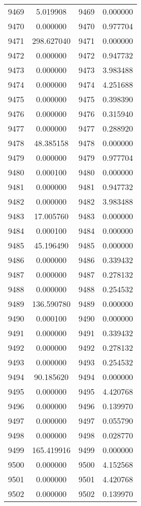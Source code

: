 \documentclass[12pt]{article}
\begin{document}
\begin{longtable}{@{}cccc@{}}
9469 & 5.019908 & 9469 & 0.000000 \\
9470 & 0.000000 & 9470 & 0.977704 \\
9471 & 298.627040 & 9471 & 0.000000 \\
9472 & 0.000000 & 9472 & 0.947732 \\
9473 & 0.000000 & 9473 & 3.983488 \\
9474 & 0.000000 & 9474 & 4.251688 \\
9475 & 0.000000 & 9475 & 0.398390 \\
9476 & 0.000000 & 9476 & 0.315940 \\
9477 & 0.000000 & 9477 & 0.288920 \\
9478 & 48.385158 & 9478 & 0.000000 \\
9479 & 0.000000 & 9479 & 0.977704 \\
9480 & 0.000100 & 9480 & 0.000000 \\
9481 & 0.000000 & 9481 & 0.947732 \\
9482 & 0.000000 & 9482 & 3.983488 \\
9483 & 17.005760 & 9483 & 0.000000 \\
9484 & 0.000100 & 9484 & 0.000000 \\
9485 & 45.196490 & 9485 & 0.000000 \\
9486 & 0.000000 & 9486 & 0.339432 \\
9487 & 0.000000 & 9487 & 0.278132 \\
9488 & 0.000000 & 9488 & 0.254532 \\
9489 & 136.590780 & 9489 & 0.000000 \\
9490 & 0.000100 & 9490 & 0.000000 \\
9491 & 0.000000 & 9491 & 0.339432 \\
9492 & 0.000000 & 9492 & 0.278132 \\
9493 & 0.000000 & 9493 & 0.254532 \\
9494 & 90.185620 & 9494 & 0.000000 \\
9495 & 0.000000 & 9495 & 4.420768 \\
9496 & 0.000000 & 9496 & 0.139970 \\
9497 & 0.000000 & 9497 & 0.055790 \\
9498 & 0.000000 & 9498 & 0.028770 \\
9499 & 165.419916 & 9499 & 0.000000 \\
9500 & 0.000000 & 9500 & 4.152568 \\
9501 & 0.000000 & 9501 & 4.420768 \\
9502 & 0.000000 & 9502 & 0.139970 \\

\end{longtable}
\end{document}
